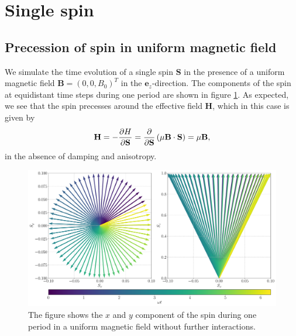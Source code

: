 \section{Single spin}
\subsection{Precession of spin in uniform magnetic field}

We simulate the time evolution of a single spin $\mathbf{S}$ in the presence of a uniform magnetic field $\mathbf{B} = (0,0,B_0)^T$ in the $\mathbf{e}_z$-direction. The components of the spin at equidistant time steps during one period are shown in figure \ref{fig:spin_1}. As expected, we see that the spin precesses around the effective field $\mathbf{H}$, which in this case is given by
\[
	\mathbf{H} = -\frac{\partial H}{\partial \mathbf{S}} = \frac{\partial}{\partial \mathbf{S}}\left( \mu \mathbf{B} \cdot \mathbf{S} \right) =\mu \mathbf{B},
\]
in the absence of damping and anisotropy.

\begin{figure}[htb]
	\centering
	\includegraphics[width=\columnwidth]{../fig/magnet_xy_1}
	\caption{The figure shows the $x$ and $y$ component of the spin during one period in a uniform magnetic field without further interactions.}
	\label{fig:spin_1}
\end{figure}

